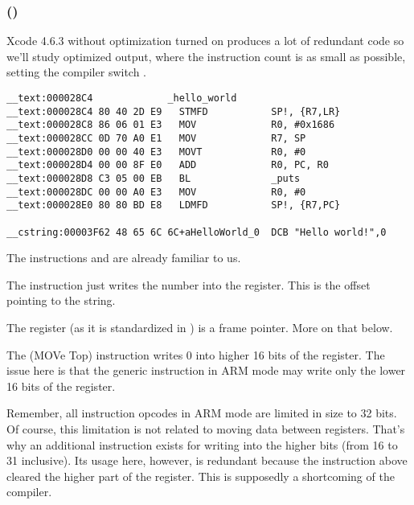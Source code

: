 \subsubsection{\OptimizingXcodeIV (\ARMMode)}

Xcode 4.6.3 without optimization turned on produces a lot of redundant code so we'll study optimized output, where the instruction count is as small as possible, setting the compiler switch \Othree.

\begin{lstlisting}[caption=\OptimizingXcodeIV (\ARMMode)]
__text:000028C4             _hello_world
__text:000028C4 80 40 2D E9   STMFD           SP!, {R7,LR}
__text:000028C8 86 06 01 E3   MOV             R0, #0x1686
__text:000028CC 0D 70 A0 E1   MOV             R7, SP
__text:000028D0 00 00 40 E3   MOVT            R0, #0
__text:000028D4 00 00 8F E0   ADD             R0, PC, R0
__text:000028D8 C3 05 00 EB   BL              _puts
__text:000028DC 00 00 A0 E3   MOV             R0, #0
__text:000028E0 80 80 BD E8   LDMFD           SP!, {R7,PC}

__cstring:00003F62 48 65 6C 6C+aHelloWorld_0  DCB "Hello world!",0
\end{lstlisting}

The instructions  and  are already familiar to us.


The \MOV instruction just writes the number  into the  register.
This is the offset pointing to the  string.

The  register (as it is standardized in \IOSABI) is a frame pointer. More on that below.

The  (MOVe Top) instruction writes 0 into higher 16 bits of the register.
The issue here is that the generic \MOV instruction in ARM mode may write only the lower 16 bits of the register.

Remember, all instruction opcodes in ARM mode are limited in size to 32 bits. Of course, this limitation is not related to moving data between registers.
That's why an additional instruction  exists for writing into the higher bits (from 16 to 31 inclusive).
Its usage here, however, is redundant because the  instruction above cleared the higher part of the register.
This is supposedly a shortcoming of the compiler.


